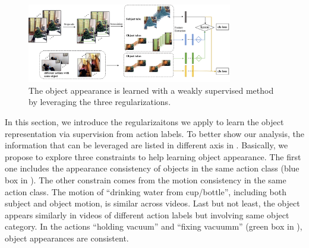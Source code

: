 \begin{figure}[ht!]
\centering
\includegraphics[width=0.8\textwidth]{figures/pipeline.pdf}
\caption{The object appearance is learned with a weakly supervised method by leveraging the three regularizations.}
\label{fig:pipeline}
\end{figure}
In this section, we introduce the regularizaitons we apply to learn the object representation via supervision from action labels. To better show our analysis, the information that can be leveraged are listed in different axis in . Basically, we propose to explore three constraints to help learning object appearance. The first one includes the appearance consistency of objects in the same action class (blue box in ). The other constrain comes from the motion consistency in the same action class. The motion of ``drinking water from cup/bottle'', including both subject and object motion, is similar across videos. Last but not least, the object appears similarly in videos of different action labels but involving same object category. In the actions ``holding vacuum'' and ``fixing vacuumm'' (green box in ), object appearances are consistent.



